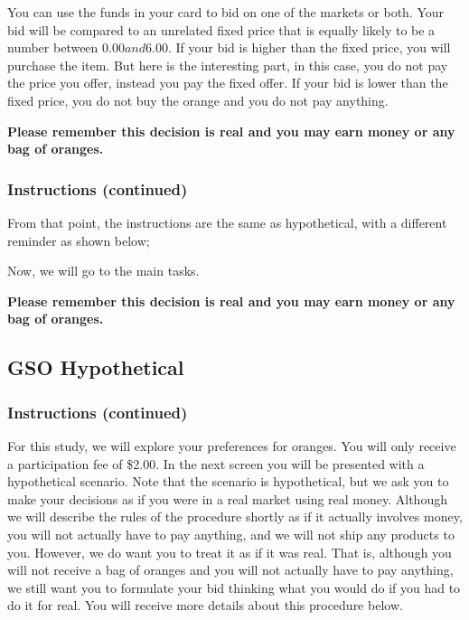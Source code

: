 \documentclass[12pt]{article}
\begin{document}
You can use the funds in your card to bid on one of the markets or both. Your bid will be compared to an unrelated fixed price that is equally likely to be a number between $0.00 and $6.00. If your bid is higher than the fixed price, you will purchase the item. But here is the interesting part, in this case, you do not pay the price you offer, instead you pay the fixed offer. If your bid is lower than the fixed price, you do not buy the orange and you do not pay anything. 

 

\textbf{Please remember this decision is real and you may earn money or any bag of oranges.}

 

 \clearpage

\subsubsection*{\textbf{Instructions (continued)}}

From that point, the instructions are the same as hypothetical, with a different reminder as shown below;

 Now, we will go to the main tasks.


\textbf{Please remember this decision is real and you may earn money or any bag of oranges.}

 \clearpage

 \subsection{GSO Hypothetical}
 \subsubsection*{\textbf{Instructions (continued)}}

For this study, we will explore your preferences for oranges. You will only receive a participation fee of \$2.00. In the next screen you will be presented with a hypothetical scenario. Note that the scenario is hypothetical, but we ask you to make your decisions as if you were in a real market using real money. Although we will describe the rules of the procedure shortly as if it actually involves money, you will not actually have to pay anything, and we will not ship any products to you. However, we do want you to treat it as if it was real. That is, although you will not receive a bag of oranges and you will not actually have to pay anything, we still want you to formulate your bid thinking what you would do if you had to do it for real. You will receive more details about this procedure below.
\end{document}
